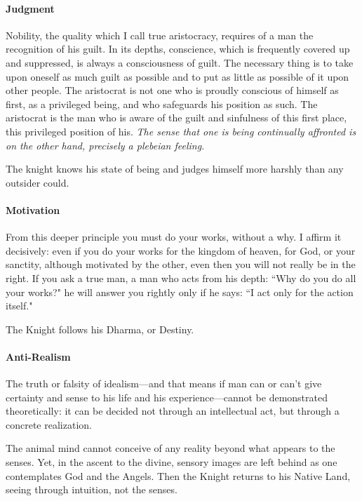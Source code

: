 \paragraph{Judgment}
\begin{quotex}
Nobility, the quality which I call true aristocracy, requires of a man the recognition of his guilt. In its depths, conscience, which is frequently covered up and suppressed, is always a consciousness of guilt. The necessary thing is to take upon oneself as much guilt as possible and to put as little as possible of it upon other people. The aristocrat is not one who is proudly conscious of himself as first, as a privileged being, and who safeguards his position as such. The aristocrat is the man who is aware of the guilt and sinfulness of this first place, this privileged position of his. \emph{The sense that one is being continually affronted is on the other hand, precisely a plebeian feeling}.  

\end{quotex}
The knight knows his state of being and judges himself more harshly than any outsider could.

\paragraph{Motivation}
\begin{quotex}
From this deeper principle you must do your works, without a why. I affirm it decisively: even if you do your works for the kingdom of heaven, for God, or your sanctity, although motivated by the other, even then you will not really be in the right. If you ask a true man, a man who acts from his depth: ``Why do you do all your works?" he will answer you rightly only if he says: ``I act only for the action itself." 

\end{quotex}
The Knight follows his Dharma, or Destiny.

\paragraph{Anti-Realism}
\begin{quotex}
The truth or falsity of idealism—and that means if man can or can't give certainty and sense to his life and his experience—cannot be demonstrated theoretically: it can be decided not through an intellectual act, but through a concrete realization. 

\end{quotex}
The animal mind cannot conceive of any reality beyond what appears to the senses. Yet, in the ascent to the divine, sensory images are left behind as one contemplates God and the Angels. Then the Knight returns to his Native Land, seeing through intuition, not the senses.

